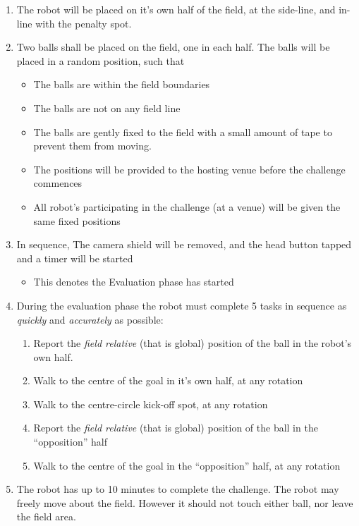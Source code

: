 \begin{enumerate}
    \item The robot will be placed on it's own half of the field, at the side-line, and in-line with the penalty spot. 
    \item Two balls shall be placed on the field, one in each half. The balls will be placed in a random position, such that
    \begin{itemize}
        \item The balls are within the field boundaries
        \item The balls are not on any field line
        \item The balls are gently fixed to the field with a small amount of tape to prevent them from moving.
        \item The positions will be provided to the hosting venue before the challenge commences
        \item All robot's participating in the challenge (at a venue) will be given the same fixed positions
    \end{itemize}
    \item In sequence, The camera shield will be removed, and the head button tapped and a timer will be started
    \begin{itemize}
        \item This denotes the Evaluation phase has started
    \end{itemize} 
    \item During the evaluation phase the robot must complete 5 tasks in sequence as \textit{quickly} and \textit{accurately} as possible:
    \begin{enumerate}
        \item Report the \textit{field relative} (that is global) position of the ball in the robot's own half.
        \item Walk to the centre of the goal in it's own half, at any rotation
        \item Walk to the centre-circle kick-off spot, at any rotation
        \item Report the \textit{field relative} (that is global) position of the ball in the ``opposition'' half
        \item Walk to the centre of the goal in the ``opposition'' half, at any rotation
    \end{enumerate}
    \item The robot has up to 10 minutes to complete the challenge. The robot may freely move about the field. However it should not touch either ball, nor leave the field area.

\end{enumerate}
